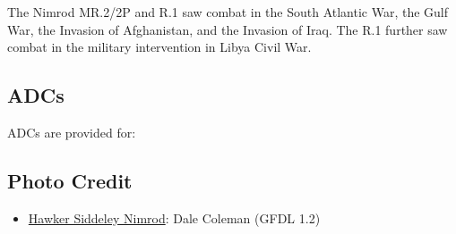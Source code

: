 The Nimrod MR.2/2P and R.1 saw combat in the South Atlantic War, the Gulf War, the Invasion of Afghanistan, and the Invasion of Iraq. The R.1 further saw combat in the military intervention in Libya Civil War.

\subsection{ADCs}

ADCs are provided for:
\begin{adclist}
\end{adclist}

\subsection{Photo Credit}
\begin{itemize}\raggedright
    \item \href{https://commons.wikimedia.org/wiki/File:British_Aerospace_Nimrod_MR.2,_United_Kingdom_-_Royal_Air_Force_(RAF)_JP506967.jpg}{Hawker Siddeley Nimrod}: Dale Coleman (GFDL 1.2)
\end{itemize}
